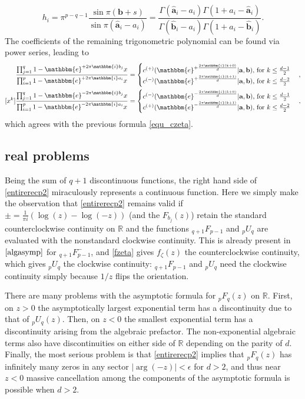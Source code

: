 \documentclass[12pt]{article}
\newcommand{\ee}[0] {\mathbbm{e}}
\newcommand{\ii}[0] {\mathbbm{i}}
\numberwithin{equation}{section}
\newcommand{\bfa}[0] {\mathbf{a}}
\newcommand{\bfb}[0] {\mathbf{b}}
\begin{document}
\begin{equation*}
h_i = \pi^{p-q-1} \frac{\sin \pi(\bfb + s) }{\sin \pi(\hat{\bfa}_i - a_i) } = \frac{\Gamma(\hat{\bfa}_i- a_i)\Gamma(1+ a_i-\hat{\bfa}_i)}{\Gamma(\hat{\bfb}_i- a_i)\Gamma(1+ a_i-\hat{\bfb}_i)}\text{.}
\end{equation*}
The coefficients of the remaining trigonometric polynomial can be found via power series, leading to
\begin{align*}
[x^k] \frac{\prod_{j=1}^{q} {1- \ee^{+2\pi \ii b_j}x}}{\prod_{i=1}^{p} {1- \ee^{+2\pi \ii a_i} x}} &= \begin{cases} c^{(+)}(\ee^{+\frac{2\pi \ii (k+0)}{d}} | \bfa, \bfb)\text{, for } k \le \frac{d-1}{2} \\
c^{(-)}(\ee^{+\frac{2\pi \ii (k+1)}{d}} | \bfa, \bfb)\text{, for } k \le \frac{d-2}{2}
\end{cases}\text{,}\\
[x^k] \frac{\prod_{j=1}^{q} {1- \ee^{-2\pi \ii b_j}x}}{\prod_{i=1}^{p} {1- \ee^{-2\pi \ii a_i} x}} &= \begin{cases} c^{(-)}(\ee^{-\frac{2\pi \ii (k+0)}{d}} | \bfa, \bfb)\text{, for } k \le \frac{d-1}{2} \\
c^{(+)}(\ee^{-\frac{2\pi \ii (k+1)}{d}} | \bfa, \bfb)\text{, for } k \le \frac{d-2}{2}
\end{cases}\text{,}
\end{align*}
which agrees with the previous formula \eqref{equ_czeta}.


\subsection{real problems}
Being the sum of $q+1$ discontinuous functions, the right hand side of \eqref{entirerecp2} miraculously represents a continuous function. Here we simply make the observation that \eqref{entirerecp2} remains valid if $\pm = \tfrac{1}{\pi i}(\log(z)-\log(-z))$ (and the $F_{b_j}(z)$) retain the standard counterclockwise continuity on $\mathbb{R}$ and the functions ${}_{q+1}F_{p-1}$ and ${}_p U_{q}$ are evaluated with the nonstandard clockwise continuity. This is already present in $\eqref{algasymp}$ for ${}_{q+1}F_{p-1}^{-}$, and \eqref{fzeta} gives $f_{\zeta}(z)$ the counterclockwise continuity, which gives ${}_p U_q$ the clockwise continuity: ${}_{q+1}F_{p-1}$ and ${}_p U_{q}$ need the clockwise continuity simply because $1/z$ flips the orientation.

There are many problems with the asymptotic formula for ${}_p F_{q}(z)$ on $\mathbb{R}$. First, on $z>0$ the asymptotically largest exponential term has a discontinuity due to that of ${}_p U_{q}(z)$. Then, on $z<0$ the smallest exponential term has a discontinuity arising from the algebraic prefactor. The non-exponential algebraic terms also have discontinuities on either side of $\mathbb{R}$ depending on the parity of $d$. Finally, the most serious problem is that \eqref{entirerecp2} implies that ${}_p F_{q}(z)$ has infinitely many zeros in any sector $|\arg(-z)| < \epsilon$ for $d>2$, and thus near $z<0$ massive cancellation among the components of the asymptotic formula is possible when $d>2$.
\end{document}
